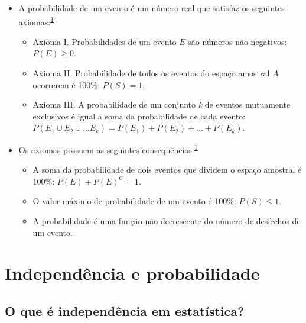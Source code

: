\documentclass[
  a4paper,
]{book}
\begin{document}
\begin{itemize}
\item
  A probabilidade de um evento é um número real que satisfaz os seguintes axiomas:\textsuperscript{\protect\hyperlink{ref-grami2023}{1}}

  \begin{itemize}
  \item
    Axioma I. Probabilidades de um evento \(E\) são números não-negativos: \(P(E)≥0\).
  \item
    Axioma II. Probabilidade de todos os eventos do espaço amostral \(A\) ocorrerem é 100\%: \(P(S)=1\).
  \item
    Axioma III. A probabilidade de um conjunto \emph{k} de eventos mutuamente exclusivos é igual a soma da probabilidade de cada evento: \(P(E_{1} \cup E_{2} \cup ... E_{k}) = P(E_{1}) + P(E_{2}) + ... + P(E_{k})\).
  \end{itemize}
\item
  Os axiomas possuem as seguintes consequências:\textsuperscript{\protect\hyperlink{ref-grami2023}{1}}

  \begin{itemize}
  \item
    A soma da probabilidade de dois eventos que dividem o espaço amostral é 100\%: \(P(E)+P(E)^C=1\).
  \item
    O valor máximo de probabilidade de um evento é 100\%: \(P(S)≤1\).
  \item
    A probabilidade é uma função não decrescente do número de desfechos de um evento.
  \end{itemize}
\end{itemize}

\hypertarget{independencia-probabilidade}{%
\section{Independência e probabilidade}\label{independencia-probabilidade}}

\hypertarget{o-que-uxe9-independuxeancia-em-estatuxedstica}{%
\subsection{O que é independência em estatística?}\label{o-que-uxe9-independuxeancia-em-estatuxedstica}}
\end{document}
